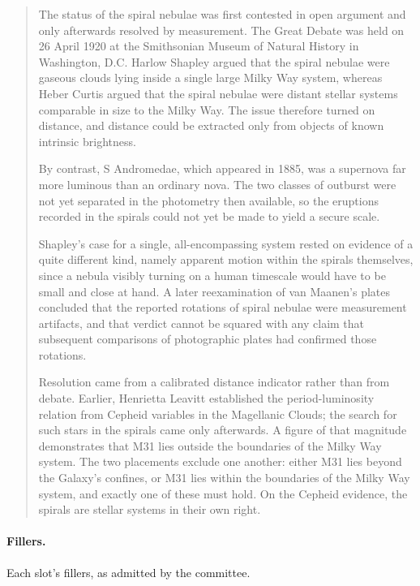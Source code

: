 \begin{quote}\small
The status of the spiral nebulae was first contested in open argument and only afterwards resolved by measurement. The Great Debate was held on 26 April 1920 at the Smithsonian Museum of Natural History in Washington, D.C. Harlow Shapley argued that the spiral nebulae were gaseous clouds lying inside a single large Milky Way system, whereas Heber Curtis argued that the spiral nebulae were distant stellar systems comparable in size to the Milky Way. The issue therefore turned on distance, and distance could be extracted only from objects of known intrinsic brightness.

 By contrast, S Andromedae, which appeared in 1885, was a supernova far more luminous than an ordinary nova. The two classes of outburst were not yet separated in the photometry then available, so the eruptions recorded in the spirals could not yet be made to yield a secure scale.

Shapley's case for a single, all-encompassing system rested on evidence of a quite different kind, namely apparent motion within the spirals themselves, since a nebula visibly turning on a human timescale would have to be small and close at hand.  A later reexamination of van Maanen's plates concluded that the reported rotations of spiral nebulae were measurement artifacts, and that verdict cannot be squared with any claim that subsequent comparisons of photographic plates had confirmed those rotations.

Resolution came from a calibrated distance indicator rather than from debate. Earlier, Henrietta Leavitt established the period-luminosity relation from Cepheid variables in the Magellanic Clouds; the search for such stars in the spirals came only afterwards.  A figure of that magnitude demonstrates that M31 lies outside the boundaries of the Milky Way system. The two placements exclude one another: either M31 lies beyond the Galaxy's confines, or M31 lies within the boundaries of the Milky Way system, and exactly one of these must hold. On the Cepheid evidence, the spirals are stellar systems in their own right.
\end{quote}

\paragraph{Fillers.} Each slot's fillers, as admitted by the committee.

